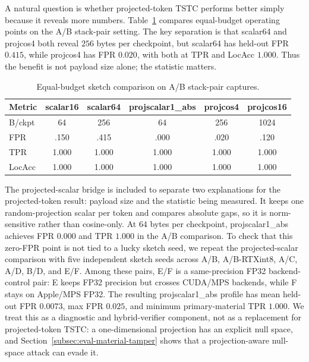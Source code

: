\documentclass[sigplan,screen,review,anonymous]{acmart}
\begin{document}
A natural question is whether projected-token TSTC performs better simply
because it reveals more numbers. Table~\ref{tab:equal-budget-sketches}
compares equal-budget operating points on the A/B stack-pair setting. The key
separation is that
scalar64 and projcos4 both reveal \(256\) bytes per checkpoint, but scalar64
has held-out FPR \(0.415\), while projcos4 has FPR \(0.020\), with both at TPR
and LocAcc \(1.000\). Thus the benefit is not payload size alone; the
statistic matters.

\begin{table}[t]
	\centering
	\caption{Equal-budget sketch comparison on A/B stack-pair captures.}
	\label{tab:equal-budget-sketches}
	\scriptsize
	\setlength{\tabcolsep}{4.5pt}
	\begin{tabular}{@{}lccccc@{}}
		\toprule
		\textbf{Metric} &
		\textbf{scalar16} &
		\textbf{scalar64} &
		\textbf{projscalar1\_abs} &
		\textbf{projcos4} &
		\textbf{projcos16} \\
		\midrule
		B/ckpt & 64 & 256 & 64 & 256 & 1024 \\
		FPR & .150 & .415 & .000 & .020 & .120 \\
		TPR & 1.000 & 1.000 & 1.000 & 1.000 & 1.000 \\
		LocAcc & 1.000 & 1.000 & 1.000 & 1.000 & 1.000 \\
		\bottomrule
	\end{tabular}
\end{table}



The projected-scalar bridge is included to separate two explanations for the
projected-token result: payload size and the statistic being measured. It keeps
one random-projection scalar per token and compares absolute gaps, so it is
norm-sensitive rather than cosine-only. At \(64\) bytes per checkpoint,
projscalar1\_abs achieves FPR \(0.000\) and TPR \(1.000\) in the A/B
comparison. To check that this zero-FPR point is not tied to a
lucky sketch seed, we repeat the projected-scalar comparison with five
independent sketch seeds across A/B, A/B-RTXint8, A/C, A/D, B/D, and E/F.
Among these pairs, E/F is a same-precision FP32 backend-control pair: E keeps
FP32 precision but crosses CUDA/MPS backends, while F stays on Apple/MPS FP32.
The resulting projscalar1\_abs profile has mean held-out FPR \(0.0073\), max
FPR \(0.025\), and minimum primary-material TPR \(1.000\). We treat this as a
diagnostic and hybrid-verifier component, not as a replacement for
projected-token TSTC: a one-dimensional projection has an explicit null space,
and Section~\ref{subsec:eval-material-tamper} shows that a projection-aware
null-space attack can evade it.
\end{document}
